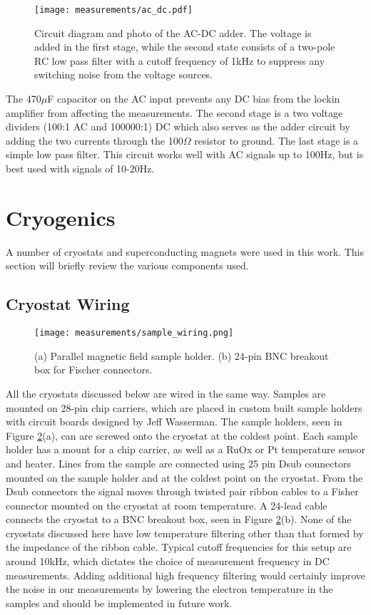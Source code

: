 \begin{figure}
    \centering
    \texttt{[image: measurements/ac\_dc.pdf]}
    \caption{Circuit diagram and photo of the AC-DC adder. The voltage is added in the first stage, while the second state consists of a two-pole RC low pass filter with a cutoff frequency of 1kHz to suppress any switching noise from the voltage sources.}
    \label{fig:ac_dc}
\end{figure}

The 470$\mu$F capacitor on the AC input prevents any DC bias from the lockin amplifier from affecting the measurements. The second stage is a two voltage dividers (100:1 AC and 100000:1) DC which also serves as the adder circuit by adding the two currents through the 100$\Omega$ resistor to ground. The last stage is a simple low pass filter. This circuit works well with AC signals up to 100Hz, but is best used with signals of 10-20Hz.

\section{Cryogenics}

A number of cryostats and superconducting magnets were used in this work. This section will briefly review the various components used.

\subsection{Cryostat Wiring}

\begin{figure}
    \centering
    \texttt{[image: measurements/sample\_wiring.png]}
    \caption{(a) Parallel magnetic field sample holder. (b) 24-pin BNC breakout box for Fischer connectors.}
    \label{fig:wiring}
\end{figure}

All the cryostats discussed below are wired in the same way. Samples are mounted on 28-pin chip carriers, which are placed in custom built sample holders with circuit boards designed by Jeff Wasserman. The sample holders, seen in Figure \ref{fig:wiring}(a), can are screwed onto the cryostat at the coldest point. Each sample holder has a mount for a chip carrier, as well as a RuOx or Pt temperature sensor and heater. Lines from the sample are connected using 25 pin Dsub connectors mounted on the sample holder and at the coldest point on the cryostat. From the Dsub connectors the signal moves through twisted pair ribbon cables to a Fisher connector mounted on the cryostat at room temperature. A 24-lead cable connects the cryostat to a BNC breakout box, seen in Figure \ref{fig:wiring}(b). None of the cryostats discussed here have low temperature filtering other than that formed by the impedance of the ribbon cable. Typical cutoff frequencies for this setup are around 10kHz, which dictates the choice of measurement frequency in DC measurements. Adding additional high frequency filtering would certainly improve the noise in our measurements by lowering the electron temperature in the samples and should be implemented in future work.


